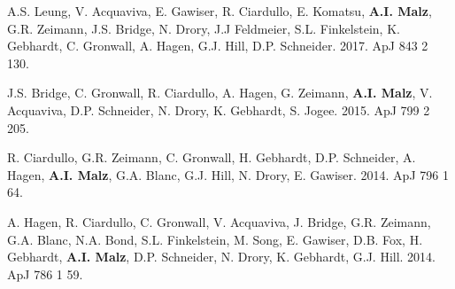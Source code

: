 \begin{etaremune}

\item A.S. Leung, V. Acquaviva, E. Gawiser, R. Ciardullo, E. Komatsu, {\bf A.I. Malz}, G.R. Zeimann, %
J.S. Bridge, N. Drory, J.J Feldmeier, S.L. Finkelstein, K. Gebhardt, C. Gronwall, A. Hagen, G.J. Hill, D.P. Schneider. 
2017. ApJ 843 2 130. 

\item J.S. Bridge, C. Gronwall, R. Ciardullo, A. Hagen, G. Zeimann, {\bf A.I. Malz}, V. Acquaviva, D.P. Schneider, N. Drory, K. Gebhardt, S. Jogee. 2015. ApJ 799 2 205. 

\item R. Ciardullo, G.R. Zeimann, C. Gronwall, H. Gebhardt, D.P. Schneider, A. Hagen, {\bf A.I. Malz}, G.A. Blanc, G.J. Hill, N. Drory, E. Gawiser. 2014. ApJ 796 1 64. 

\item A. Hagen, R. Ciardullo, C. Gronwall, V. Acquaviva, J. Bridge, G.R. Zeimann, G.A. Blanc, N.A. Bond, S.L. Finkelstein, M. Song, E. Gawiser, D.B. Fox, H. Gebhardt, {\bf A.I. Malz}, D.P. Schneider, N. Drory, K. Gebhardt, G.J. Hill. 2014. ApJ 786 1 59. 

\end{etaremune}



